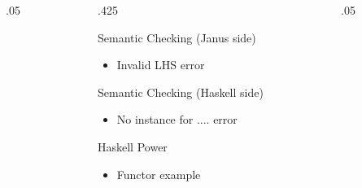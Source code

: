 \documentclass[final,hyperref={pdfpagelabels=false}]{beamer}
\newcommand\sepsize{.05\textwidth}
\newcommand\colsize{.425\textwidth}
\begin{document}
\begin{frame}[t]
\begin{columns}[t]
\begin{column}{\sepsize}\end{column} %
 
\begin{column}{\colsize} %


\begin{block}{Semantic Checking (Janus side)}
	\begin{itemize}
		\item Invalid LHS error
	\end{itemize}
\end{block}

\begin{block}{Semantic Checking (Haskell side)}
	\begin{itemize}
		\item No instance for .... error
	\end{itemize}     
\end{block}

\begin{block}{Haskell Power}
	\begin{itemize}
		\item Functor example
	\end{itemize}
\end{block}


\end{column} %

\begin{column}{\sepsize}\end{column} %

\end{columns} %

\end{frame} %
\end{document}
